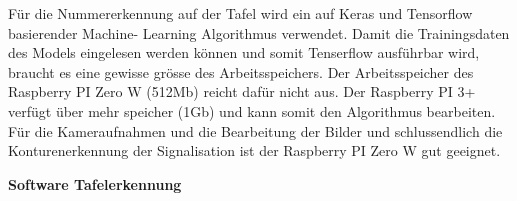 \documentclass[../../main.tex]{subfiles}
\begin{document}
    Für die Nummererkennung auf der Tafel wird ein auf Keras und Tensorflow basierender Machine- Learning Algorithmus verwendet. Damit die Trainingsdaten des Models eingelesen werden können und somit Tenserflow ausführbar wird, braucht es eine gewisse grösse des Arbeitsspeichers. Der Arbeitsspeicher des Raspberry PI Zero W (512Mb) reicht dafür nicht aus. Der Raspberry PI 3+ verfügt über mehr speicher (1Gb) und kann somit den Algorithmus bearbeiten. Für die Kameraufnahmen und die Bearbeitung der Bilder und schlussendlich die Konturenerkennung der Signalisation ist der Raspberry PI Zero W gut geeignet. \cite{raspberrypi3A+}
    \pagebreak

    \textbf{Software Tafelerkennung}
    
\end{document}
